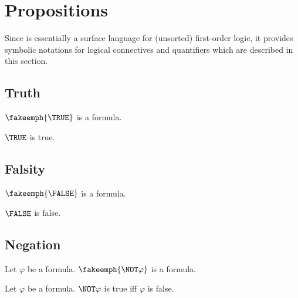 \documentclass{stex}
\begin{document}


\section{Propositions}\label{sec:propositions}

Since \ForTheL is essentially a surface language for (unsorted) first-order logic,
it provides symbolic notations for logical connectives and quantifiers which are
described in this section.


\subsection{Truth}\label{sec:truth}

\begin{sparagraph}[style=symdoc,for=TRUE]
  \begin{signature*}
    $\fakeemph{\TRUE}$ is a formula.
  \end{signature*}

  \begin{axiom*}
    $\TRUE$ is true.
  \end{axiom*}
\end{sparagraph}


\subsection{Falsity}\label{sec:falsity}

\begin{sparagraph}[style=symdoc,for=FALSE]
  \begin{signature*}
    $\fakeemph{\FALSE}$ is a formula.
  \end{signature*}

  \begin{axiom*}
    $\FALSE$ is false.
  \end{axiom*}
\end{sparagraph}


\subsection{Negation}\label{sec:negation}

\begin{sparagraph}[style=symdoc,for=NOT]
  \begin{signature*}
    Let $\varphi$ be a formula.
    $\fakeemph{\NOT \varphi}$ is a formula.
  \end{signature*}

  \begin{axiom*}
    Let $\varphi$ be a formula.
    $\NOT\varphi$ is true iff $\varphi$ is false.
  \end{axiom*}
\end{sparagraph}
\end{document}
